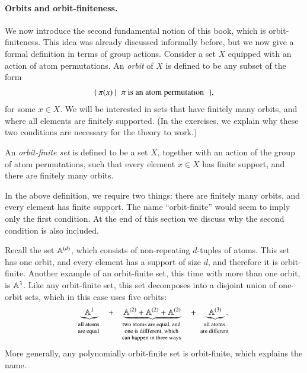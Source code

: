\paragraph*{Orbits and orbit-finiteness.} We now introduce the second fundamental notion of this book, which is orbit-finiteness. This idea was already discussed informally before, but we now give a formal definition in terms of group actions.  Consider a set  $X$  equipped with an action of atom permutations.  An \emph{orbit} of $X$ is defined to be  any subset of the form  
    \begin{align*}
        \setbuild{ \pi(x)}{$\pi$ is an atom permutation},
    \end{align*}
    for some $x \in X$. We will be interested in sets that have finitely many orbits, and where all elements are finitely supported. (In the exercises, we explain why these two conditions are necessary for the theory to work.)


\begin{definition}\label{def:orbit-finite-set-equality}
	An \emph{orbit-finite set} is defined to be a set $X$, together with an action of the group of atom permutations, such that every element $x \in X$ has finite support, and there are finitely many orbits. 
\end{definition}

In the above definition, we require two things: there are finitely many orbits, and every element has finite support. The name ``orbit-finite'' would seem to imply only the first condition. At the end of this section we discuss why the second condition is also included.

\begin{myexample}\label{ex:pof-sets-orbit-finite}
    Recall the set $\mathbb A^{(d)}$, which consists of non-repeating $d$-tuples of atoms. This set has one orbit, and every element has a support of size $d$, and therefore it is orbit-finite.  Another example of an orbit-finite set, this time with more than one orbit, is  $\mathbb A^3$. Like any orbit-finite set, this set decomposes into a disjoint union of one-orbit sets, which in this case uses five orbits:
    \begin{align*}
    \myunderbrace{\atoms^1}{all atoms\\ are equal} 
    \quad + \quad 
    \myunderbrace{\atoms^{(2)} + \atoms^{(2)} + \atoms^{(2)}}{two atoms are equal, and\\ one is diffferent, which\\ can happen in three ways} 
    \quad + \quad 
    \myunderbrace{\atoms^{(3)}}{all atoms\\ are different}.
    \end{align*} 
    More generally, any polynomially orbit-finite set is orbit-finite, which explains the name.
\end{myexample}


